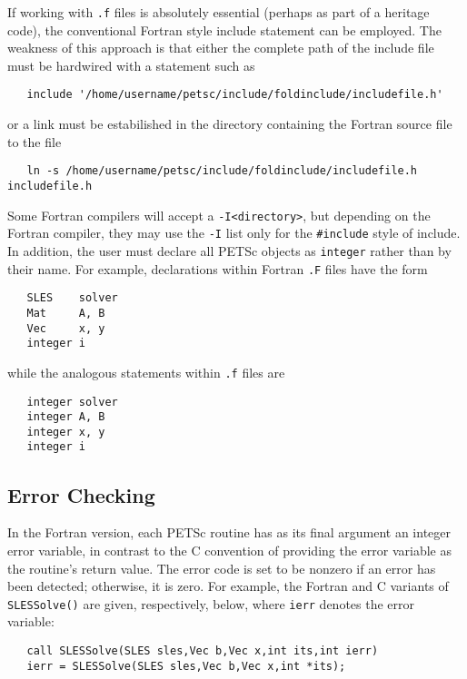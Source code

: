 {
If working with {\tt .f} files is absolutely essential (perhaps as
part of a heritage code), the conventional Fortran style include
statement can be employed.  The weakness of this approach is that either the
complete path of the include file must be hardwired with a statement such as
\begin{verbatim}
   include '/home/username/petsc/include/foldinclude/includefile.h'
\end{verbatim}
or a link must be estabilished in the directory containing the Fortran source
file to the file
\begin{verbatim}
   ln -s /home/username/petsc/include/foldinclude/includefile.h includefile.h
\end{verbatim}
Some Fortran compilers will accept a {\tt -I<directory>}, but depending on the
Fortran compiler, they may use the {\tt -I} list only for the {\tt \#include}
style of include.
In addition, the user must declare all PETSc objects as {\tt integer} 
rather than by their name. For example, declarations within Fortran
{\tt .F} files have the form
\begin{verbatim}
   SLES    solver
   Mat     A, B
   Vec     x, y
   integer i
\end{verbatim}
while the analogous statements within {\tt .f} files are
\begin{verbatim}
   integer solver
   integer A, B
   integer x, y
   integer i
\end{verbatim}

\subsection{Error Checking}
\label{sec:fortran_errors}

In the Fortran version, each PETSc routine has as its final argument
an integer error variable, in contrast to the C convention of
providing the error variable as the routine's return value.  The error
code is set to be nonzero if an error has been detected; otherwise, it
is zero.  For example, the Fortran and C variants of {\tt SLESSolve()} are
given, respectively, below, where {\tt ierr} denotes the error variable:
\begin{verbatim}
   call SLESSolve(SLES sles,Vec b,Vec x,int its,int ierr)
   ierr = SLESSolve(SLES sles,Vec b,Vec x,int *its);
\end{verbatim}

}
